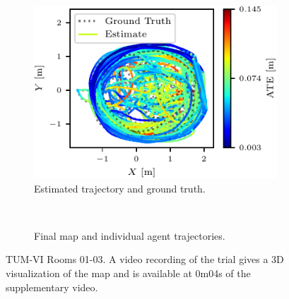 \begin{figure}[h]
    \centering
    \captionsetup{format=plain}
    \begin{subfigure}[t]{0.5\linewidth}
        \centering
        \includegraphics[width=0.9\linewidth]{figures/apr11_tum_room_trajectory_a_trajectory.pdf}
        \caption{Estimated trajectory and ground truth.}
    \end{subfigure}\hfill%
    ~
    \begin{subfigure}[t]{0.45\linewidth}
        \centering
        \caption{Final map and individual agent trajectories.}
    \end{subfigure}

    \caption{TUM-VI Rooms 01-03. A video recording of the trial gives a 3D visualization of the map and is available at 0m04s of the supplementary video\protect\footnotemark[1].}
    \label{fig:tum-traj}
\end{figure}


